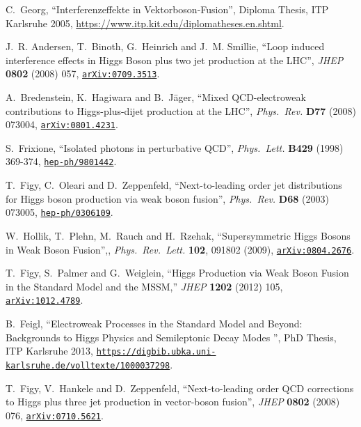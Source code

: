 \documentclass[english,12pt]{article}
\begin{document}
\begin{thebibliography}{10}
C.~Georg, ``Interferenzeffekte in Vektorboson-Fusion'', {Diploma Thesis, ITP
  Karlsruhe 2005}, {\url{https://www.itp.kit.edu/diplomatheses.en.shtml}}.

J.~R. Andersen, T.~Binoth, G.~Heinrich and J.~M. Smillie, ``{Loop induced
  interference effects in Higgs Boson plus two jet production at the LHC}'',
  {\em JHEP} {\bf 0802} (2008) 057,
\href{https://www.arXiv.org/abs/0709.3513}{{\tt arXiv:0709.3513}}.

A.~Bredenstein, K.~Hagiwara and B.~J\"{a}ger, ``{Mixed QCD-electroweak
  contributions to Higgs-plus-dijet production at the LHC}'', {\em Phys.\ Rev.}
  {\bf D77} (2008) 073004,
\href{https://www.arXiv.org/abs/0801.4231}{{\tt arXiv:0801.4231}}.

S.~Frixione,
  ``Isolated photons in perturbative QCD'',
  {\em Phys.\ Lett.} {\bf B429} (1998) 369-374,
\href{https://www.arXiv.org/abs/hep-ph/9801442}{{\tt hep-ph/9801442}}.

T.~Figy, C.~Oleari and D.~Zeppenfeld, ``Next-to-leading order jet
  distributions for Higgs boson production via weak boson fusion'', {\em Phys.\
  Rev.} {\bf D68} (2003) 073005,
\href{https://www.arXiv.org/abs/hep-ph/0306109}{{\tt hep-ph/0306109}}.

  W.~Hollik, T.~Plehn, M.~Rauch and H.~Rzehak,
  ``Supersymmetric Higgs Bosons in Weak Boson Fusion'',,
  {\em Phys.\ Rev.\ Lett.} {\bf 102}, 091802 (2009),
  \href{https://www.arXiv.org/abs/0804.2676}{{\tt arXiv:0804.2676}}.

 T.~Figy, S.~Palmer and G.~Weiglein,
 ``Higgs Production via Weak Boson Fusion in the Standard Model and the MSSM,''
 {\em JHEP} {\bf 1202} (2012) 105,
 \href{https://www.arXiv.org/abs/1012.4789}{{\tt arXiv:1012.4789}}.

B.~Feigl, ``Electroweak Processes in the Standard Model and Beyond: Backgrounds to Higgs Physics and Semileptonic Decay Modes '', {PhD Thesis, ITP Karlsruhe 2013}, 
\href{https://digbib.ubka.uni-karlsruhe.de/volltexte/1000037298}{{\tt https://digbib.ubka.uni-karlsruhe.de/volltexte/1000037298}}.

T.~Figy, V.~Hankele and D.~Zeppenfeld, ``{Next-to-leading order QCD
  corrections to Higgs plus three jet production in vector-boson fusion}'',
  {\em JHEP} {\bf 0802} (2008) 076,
\href{https://www.arXiv.org/abs/0710.5621}{{\tt arXiv:0710.5621}}.


\end{thebibliography}
\end{document}
